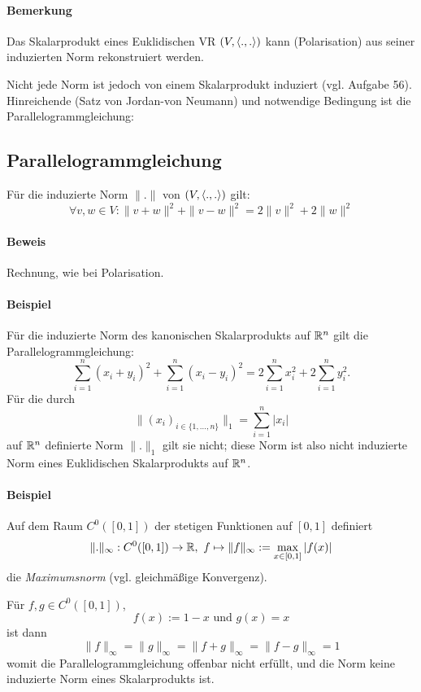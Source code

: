 \paragraph{Bemerkung}
	Das Skalarprodukt eines Euklidischen VR $ (V,\langle .,. \rangle) $ kann (Polarisation) aus seiner induzierten Norm rekonstruiert werden.
	
	Nicht jede Norm ist jedoch von einem Skalarprodukt induziert (vgl. Aufgabe 56).
	Hinreichende (Satz von Jordan-von Neumann) und notwendige Bedingung ist die Parallelogrammgleichung:
	
\subsection{Parallelogrammgleichung}
\begin{Satz}[Parallelogrammgleichung]
	Für die induzierte Norm $ \|.\| $ von $ (V,\langle .,. \rangle) $ gilt:
		\[ \forall v,w\in V: \|v+w\|^2+\|v-w\|^2=2\|v\|^2+2\|w\|^2 \]
\end{Satz}		

 	\begin{figure}[H]\centering
 		
	\end{figure}
		
\paragraph{Beweis}
	Rechnung, wie bei Polarisation.
\paragraph{Beispiel}
	Für die induzierte Norm des kanonischen Skalarprodukts auf $ \mathbb{R}^n $ gilt die Parallelogrammgleichung:
		\[ \sum_{i=1}^{n}(x_i+y_i)^2 + \sum_{i=1}^{n}(x_i-y_i)^2 = 2\sum_{i=1}^{n}x_i^2+2\sum_{i=1}^{n}y_i^2. \]
	Für die durch
		\[ \|(x_i)_{i\in \{1,\dots,n\}}\|_1 = \sum_{i=1}^{n}|x_i| \]
	auf $ \mathbb{R}^n $ definierte Norm $ \|.\|_1 $ gilt sie nicht; diese Norm ist also nicht induzierte Norm eines Euklidischen Skalarprodukts auf $ \mathbb{R}^n $.
\paragraph{Beispiel}
	Auf dem Raum $ C^0([0,1]) $ der stetigen Funktionen auf $ [0,1] $ definiert
		\[ \|.\|_\infty: C^0([0,1]) \to \R,\ f\mapsto \|f\|_\infty := \max_{x\in [0,1]}|f(x)| \]
	die \emph{Maximumsnorm} (vgl. gleichmäßige Konvergenz).
	
	Für $ f,g\in C^0([0,1]) $,
		\[ f(x):= 1-x \text{ und } g(x) = x \]
	ist dann
		\[ \|f\|_\infty = \|g\|_\infty = \|f+g\|_\infty = \|f-g\|_\infty = 1 \]
	womit die Parallelogrammgleichung offenbar nicht erfüllt, und die Norm keine induzierte Norm eines Skalarprodukts ist.